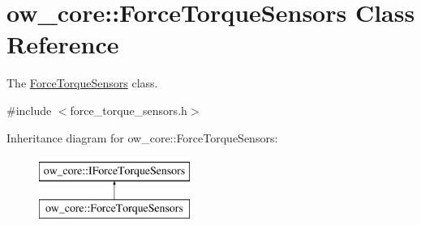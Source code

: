 \hypertarget{classow__core_1_1ForceTorqueSensors}{}\section{ow\+\_\+core\+:\+:Force\+Torque\+Sensors Class Reference}
\label{classow__core_1_1ForceTorqueSensors}


The \hyperlink{classow__core_1_1ForceTorqueSensors}{Force\+Torque\+Sensors} class.  




{\ttfamily \#include $<$force\+\_\+torque\+\_\+sensors.\+h$>$}

Inheritance diagram for ow\+\_\+core\+:\+:Force\+Torque\+Sensors\+:\begin{figure}[H]
\begin{center}
\leavevmode
\includegraphics[height=2.000000cm]{de/d94/classow__core_1_1ForceTorqueSensors}
\end{center}
\end{figure}
